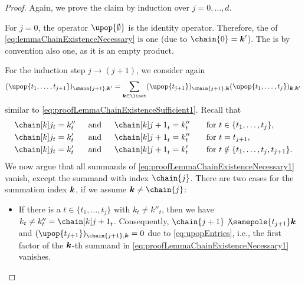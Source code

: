 \begin{proof}
  Again, we prove the claim by induction over $j = 0, \dotsc, d$.
  
  For $j = 0$, the operator $\upop{\emptyset}$ is the identity operator.
  Therefore, the \lhs of \eqref{eq:lemmaChainExistenceNecessary} is one
  (due to $\chain{0} = \*k'$).
  The \rhs is by convention also one, as it is an empty product.
  
  For the induction step $j \to (j+1)$, we consider again
  \begin{equation}
    \label{eq:proofLemmaChainExistenceNecessary1}
    (\upop{t_1,\dotsc,t_{j+1}})_{\chain{j+1},\*k'}
    = \sum_{\*k \in \liset} (\upop{t_{j+1}})_{\chain{j+1},\*k}
    (\upop{t_1,\dotsc,t_j})_{\*k,\*k'}
  \end{equation}
  similar to \eqref{eq:proofLemmaChainExistenceSufficient1}.
  Recall that
  \begin{alignat}{4}
    \chainuv{j}_t
    &= k''_t
    &&\;\;\text{and}\;\;
    &\chainuv{j+1}_t
    &= k''_t
    &&\quad\text{for } t \in \{t_1, \dotsc, t_j\},\\
    \chainuv{j}_t
    &= k'_t
    &&\;\;\text{and}\;\;
    &\chainuv{j+1}_t
    &= k''_t
    &&\quad\text{for } t = t_{j+1},\\
    \chainuv{j}_t
    &= k'_t
    &&\;\;\text{and}\;\;
    &\chainuv{j+1}_t
    &= k'_t
    &&\quad\text{for } t \notin \{t_1, \dotsc, t_j, t_{j+1}\}.
  \end{alignat}
  We now argue that all summands of
  \eqref{eq:proofLemmaChainExistenceNecessary1} vanish,
  except the summand with index $\chain{j}$.
  There are two cases for the summation index ${\boldsymbol{k}}$,
  if we assume $\*k \not= \chain{j}$:
  \begin{itemize}
    \item
    If there is a $t \in \{t_1, \dotsc, t_j\}$ with $k_t \not= k''_t$,
    then we have $k_t \not= k''_t = \chainuv{j+1}_t$.
    Consequently, $\chain{j+1} \not\samepole{t_{j+1}} \*k$ and
    $(\upop{t_{j+1}})_{\chain{j+1},\*k} = 0$ due to \eqref{eq:upopEntries},
    i.e., the first factor of the ${\boldsymbol{k}}$-th summand in
    \eqref{eq:proofLemmaChainExistenceNecessary1} vanishes.
    

\end{itemize}
\end{proof}
